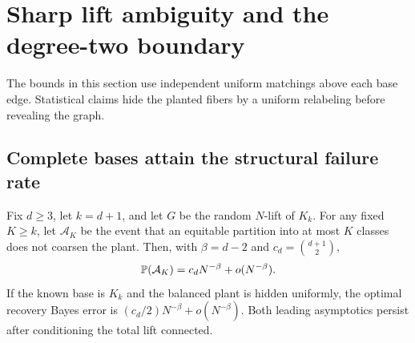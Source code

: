\section{Sharp lift ambiguity and the degree-two boundary}\label{sec:lift-boundary}
The bounds in this section use independent uniform matchings above each
base edge. Statistical claims hide the planted fibers by a uniform
relabeling before revealing the graph.

\subsection{Complete bases attain the structural failure rate}
\begin{theorem}\label{thm:complete-lift-sharp}
Fix $d\ge3$, let $k=d+1$, and let $G$ be the random $N$-lift of
$K_k$. For any fixed $K\ge k$, let $\mathcal A_K$ be the event that
an equitable partition into at most $K$ classes does not coarsen the plant.
Then, with $\beta=d-2$ and $c_d=\binom{d+1}{2}$,
\[
 \mathbb P(\mathcal A_K)=c_dN^{-\beta}+o(N^{-\beta}).
\]
If the known base is $K_k$ and the balanced plant is hidden uniformly,
the optimal recovery Bayes error is
$(c_d/2)N^{-\beta}+o(N^{-\beta})$. Both leading asymptotics persist
after conditioning the total lift connected.
\end{theorem}
